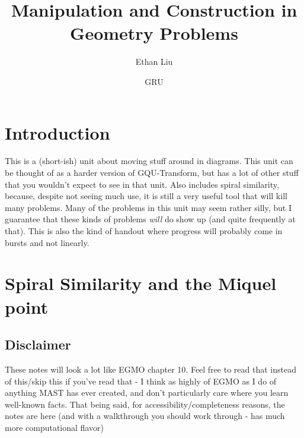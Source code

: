 \documentclass[11pt]{article}
\begin{document}
\title{Manipulation and Construction in Geometry Problems}
\author{Ethan Liu}
\date{GRU}
\maketitle
\section{Introduction}
This is a (short-ish) unit about moving stuff around in diagrams. This unit can be thought of as a harder version of GQU-Transform, but has a lot of other stuff that you wouldn't expect to see in that unit. Also includes spiral similarity, because, despite not seeing much use, it is still a very useful tool that will kill many problems.
Many of the problems in this unit may seem rather silly, but I guarantee that these kinds of problems \textit{will} do show up (and quite frequently at that). This is also the kind of handout where progress will probably come in bursts and not linearly.
\section{Spiral Similarity and the Miquel point}
\subsection{Disclaimer}
These notes will look a lot like EGMO chapter 10. Feel free to read that instead of this/skip this if you've read that - I think as highly of EGMO as I do of anything MAST has ever created, and don't particularly care where you learn well-known facts. That being said, for accessibility/completeness reasons, the notes are here (and with a walkthrough you should work through - has much more computational flavor) 
\end{document}

